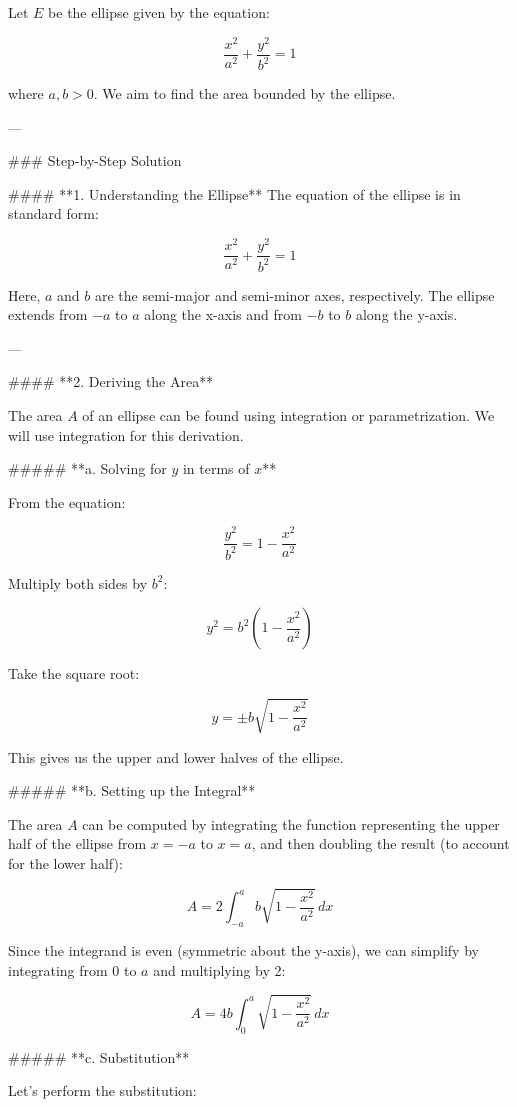
Let \( E \) be the ellipse given by the equation:

\[
\frac{x^2}{a^2} + \frac{y^2}{b^2} = 1
\]

where \( a, b > 0 \). We aim to find the area bounded by the ellipse.

---

### Step-by-Step Solution

#### **1. Understanding the Ellipse**
The equation of the ellipse is in standard form:

\[
\frac{x^2}{a^2} + \frac{y^2}{b^2} = 1
\]

Here, \( a \) and \( b \) are the semi-major and semi-minor axes, respectively. The ellipse extends from \( -a \) to \( a \) along the x-axis and from \( -b \) to \( b \) along the y-axis.

---

#### **2. Deriving the Area**

The area \( A \) of an ellipse can be found using integration or parametrization. We will use integration for this derivation.

##### **a. Solving for \( y \) in terms of \( x \)**

From the equation:

\[
\frac{y^2}{b^2} = 1 - \frac{x^2}{a^2}
\]

Multiply both sides by \( b^2 \):

\[
y^2 = b^2 \left(1 - \frac{x^2}{a^2}\right)
\]

Take the square root:

\[
y = \pm b \sqrt{1 - \frac{x^2}{a^2}}
\]

This gives us the upper and lower halves of the ellipse.

##### **b. Setting up the Integral**

The area \( A \) can be computed by integrating the function representing the upper half of the ellipse from \( x = -a \) to \( x = a \), and then doubling the result (to account for the lower half):

\[
A = 2 \int_{-a}^{a} b \sqrt{1 - \frac{x^2}{a^2}} \, dx
\]

Since the integrand is even (symmetric about the y-axis), we can simplify by integrating from \( 0 \) to \( a \) and multiplying by 2:

\[
A = 4b \int_{0}^{a} \sqrt{1 - \frac{x^2}{a^2}} \, dx
\]

##### **c. Substitution**

Let’s perform the substitution:

